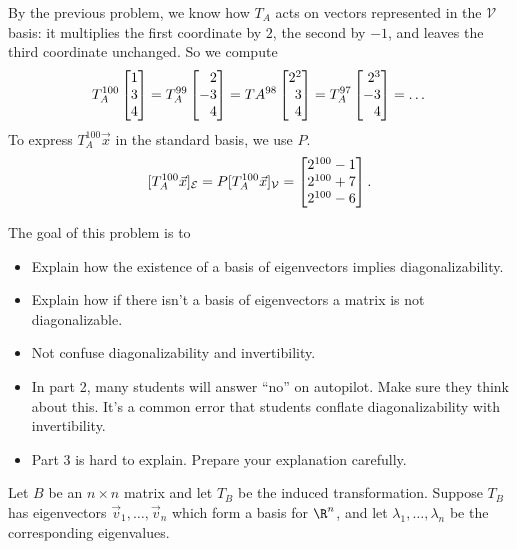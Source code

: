 \documentclass{problemset}
\newcommand{\bookonlynewpage}{\begin{bookonly}\newpage\end{bookonly}}
\begin{document}
\begin{parts}
\begin{solution}
				By the previous problem, we know how $T_A$ acts on vectors represented
				in the $\mathcal V$ basis: it multiplies the first coordinate by
				$2$, the second by $-1$, and leaves the third coordinate unchanged.
				So we compute
				\[
					T_A^{100}\mat{1\\3\\4}
					=T_A^{99}\mat{2\\-3\\4}
					=TA^{98}\mat{2^2\\3\\4}
					=T_A^{97}\mat{2^3\\-3\\4}
					=\dots
				\]
				To express $T_A^{100}\vec x$ in the standard basis, we use $P$.
				\[
					[T_A^{100}\vec x]_{\mathcal E} = P[T_A^{100}\vec x]_{\mathcal V} = \mat{2^{100}-1\\2^{100}+7\\2^{100}-6}.
				\]
			\end{solution}
	\end{parts}


	\bookonlynewpage
	\question
	\begin{annotation}
		\begin{goals}

			The goal of this problem is to
			\begin{itemize}
				\item Explain how the existence of a basis of eigenvectors implies diagonalizability.
				\item Explain how if there isn't a basis of eigenvectors a matrix is not diagonalizable.
				\item Not confuse diagonalizability and invertibility.
			\end{itemize}
		\end{goals}

		\begin{notes}
			\begin{itemize}
				\item In part 2, many students will answer ``no'' on autopilot. Make
					sure they think about this. It's a common error that students
					conflate diagonalizability with invertibility.
				\item Part 3 is hard to explain. Prepare your explanation carefully.
			\end{itemize}
		\end{notes}
	\end{annotation}
	Let $B$ be an $n\times n$ matrix and let $T_B$ be the induced transformation.
	Suppose $T_B$ has eigenvectors $\vec v_1,\ldots, \vec v_n$ which
	form a basis for $\R^n$, and let $\lambda_1,\ldots,\lambda_n$ be the corresponding
	eigenvalues.
\end{document}
